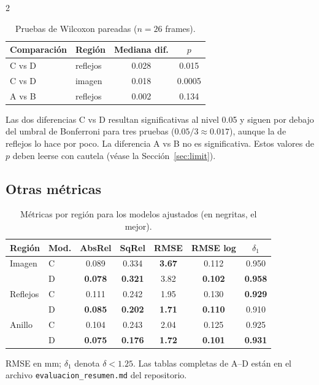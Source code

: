 \documentclass[11pt,letterpaper]{article}
\begin{document}
\begin{multicols}{2}
\begin{table}[H]
\centering
\scriptsize
\caption{Pruebas de Wilcoxon pareadas ($n=26$ frames).}
\label{tab:wilcoxon}
\begin{tabular}{@{}llcc@{}}
\toprule
Comparación & Región & Mediana dif. & $p$ \\
\midrule
C vs D & reflejos & 0.028 & 0.015 \\
C vs D & imagen & 0.018 & 0.0005 \\
A vs B & reflejos & 0.002 & 0.134 \\
\bottomrule
\end{tabular}
\end{table}

Las dos diferencias C vs D resultan significativas al nivel 0.05 y siguen por debajo del umbral de Bonferroni para tres pruebas ($0.05/3\approx0.017$), aunque la de reflejos lo hace por poco. La diferencia A vs B no es significativa. Estos valores de $p$ deben leerse con cautela (véase la Sección~\ref{sec:limit}).

\subsection{Otras métricas}

\begin{table}[H]
\centering
\scriptsize
\setlength{\tabcolsep}{3pt}
\caption{Métricas por región para los modelos ajustados (en negritas, el mejor).}
\label{tab:otras}
\begin{tabular}{@{}llccccc@{}}
\toprule
Región & Mod. & AbsRel & SqRel & RMSE & RMSE log & $\delta_1$ \\
\midrule
Imagen & C & 0.089 & 0.334 & \textbf{3.67} & 0.112 & 0.950 \\
 & D & \textbf{0.078} & \textbf{0.321} & 3.82 & \textbf{0.102} & \textbf{0.958} \\
Reflejos & C & 0.111 & 0.242 & 1.95 & 0.130 & \textbf{0.929} \\
 & D & \textbf{0.085} & \textbf{0.202} & \textbf{1.71} & \textbf{0.110} & 0.910 \\
Anillo & C & 0.104 & 0.243 & 2.04 & 0.125 & 0.925 \\
 & D & \textbf{0.075} & \textbf{0.176} & \textbf{1.72} & \textbf{0.101} & \textbf{0.931} \\
\bottomrule
\end{tabular}
\end{table}

\noindent RMSE en mm; $\delta_1$ denota $\delta<1.25$. Las tablas completas de A--D están en el archivo \texttt{evaluacion\_\allowbreak resumen.md} del repositorio.


\end{multicols}
\end{document}
